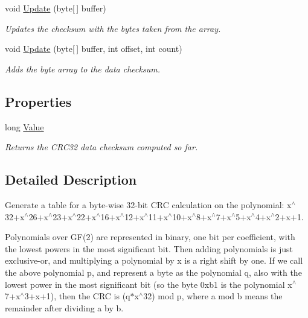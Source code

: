 \begin{DoxyCompactItemize}
void \hyperlink{class_i_c_sharp_code_1_1_sharp_zip_lib_1_1_checksums_1_1_crc32_aed937de570263627f41641aea63e399f}{Update} (byte\mbox{[}$\,$\mbox{]} buffer)
\begin{DoxyCompactList}\small\item\em Updates the checksum with the bytes taken from the array. \end{DoxyCompactList}\item 
void \hyperlink{class_i_c_sharp_code_1_1_sharp_zip_lib_1_1_checksums_1_1_crc32_ae980cf50bb530eab0e0d031d1771e7f9}{Update} (byte\mbox{[}$\,$\mbox{]} buffer, int offset, int count)
\begin{DoxyCompactList}\small\item\em Adds the byte array to the data checksum. \end{DoxyCompactList}\end{DoxyCompactItemize}
\subsection*{Properties}
\begin{DoxyCompactItemize}
\item 
long \hyperlink{class_i_c_sharp_code_1_1_sharp_zip_lib_1_1_checksums_1_1_crc32_ac212dc8334cf41f793fd0648be50c73b}{Value}
\begin{DoxyCompactList}\small\item\em Returns the C\+R\+C32 data checksum computed so far. \end{DoxyCompactList}\end{DoxyCompactItemize}


\subsection{Detailed Description}
Generate a table for a byte-\/wise 32-\/bit C\+RC calculation on the polynomial\+: x$^\wedge$32+x$^\wedge$26+x$^\wedge$23+x$^\wedge$22+x$^\wedge$16+x$^\wedge$12+x$^\wedge$11+x$^\wedge$10+x$^\wedge$8+x$^\wedge$7+x$^\wedge$5+x$^\wedge$4+x$^\wedge$2+x+1. 

Polynomials over G\+F(2) are represented in binary, one bit per coefficient, with the lowest powers in the most significant bit. Then adding polynomials is just exclusive-\/or, and multiplying a polynomial by x is a right shift by one. If we call the above polynomial p, and represent a byte as the polynomial q, also with the lowest power in the most significant bit (so the byte 0xb1 is the polynomial x$^\wedge$7+x$^\wedge$3+x+1), then the C\+RC is (q$\ast$x$^\wedge$32) mod p, where a mod b means the remainder after dividing a by b.

